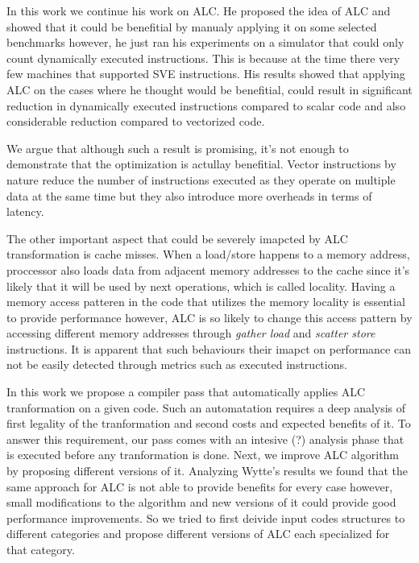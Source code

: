 \documentclass[\main/thesis.tex]{subfiles}
\begin{document}
In this work we continue his work on ALC. He proposed the idea of ALC and showed that it could be benefitial by manualy applying it on some selected benchmarks however, he just ran his experiments on a simulator that could only count dynamically executed instructions. This is because at the time there very few machines 
that supported SVE instructions. His results showed that applying ALC on the cases where he thought would be benefitial, could result in significant reduction in dynamically executed instructions compared to scalar code and also considerable reduction compared to vectorized code.

We argue that although such a result is promising, it's not enough to demonstrate that the optimization is actullay benefitial. Vector instructions by nature reduce the number of instructions executed as they operate on multiple data at the same time but they also introduce more overheads in terms of latency. 

The other important aspect that could be severely imapcted by ALC transformation is cache misses. When a load/store happens to a memory address, proccessor also loads data from adjacent memory addresses to the cache since it's likely that it will be used by next operations, which is called locality. Having a memory access patteren in the code that 
utilizes the memory locality is essential to provide performance however, ALC is so likely to change this access pattern by accessing different memory addresses through \emph{gather load} and \emph{scatter store} instructions. It is apparent that such behaviours their imapct on performance can not be easily detected through metrics such as executed instructions.

In this work we propose a compiler pass that automatically applies ALC tranformation on a given code. Such an automatation requires a deep analysis of first legality of the tranformation and second costs and expected benefits of it. To answer this requirement, our pass comes with an intesive (?) analysis phase that is executed before any tranformation is done. Next, 
we improve ALC algorithm by proposing different versions of it. Analyzing Wytte's results we found that the same approach for ALC is not able to provide benefits for every case however, small modifications to the algorithm and new versions of it could provide good performance improvements. So we tried to first deivide input codes structures to different categories and
propose different versions of ALC each specialized for that category.
\end{document}
